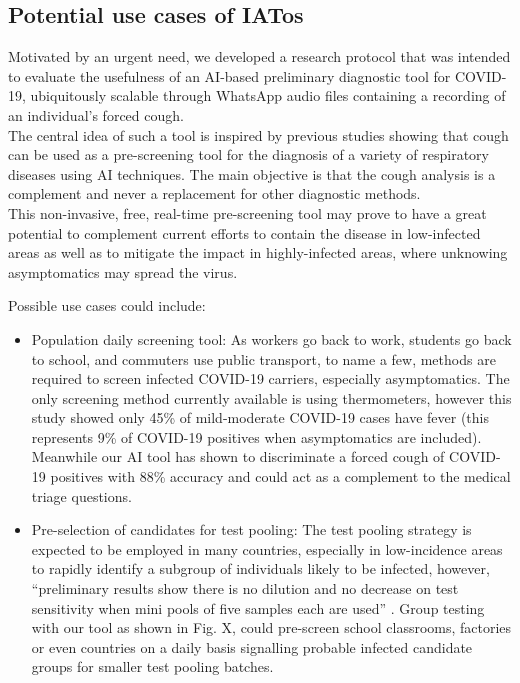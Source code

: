 \documentclass{nle}
\begin{document}
\subsection{Potential use cases of IATos}

Motivated by an urgent need, we developed a research protocol that was intended to evaluate the usefulness of an AI-based preliminary diagnostic tool for COVID-19, ubiquitously scalable through WhatsApp audio files containing a recording of an individual's forced cough.\\

The central idea of such a tool is inspired by previous studies \cite{10} \cite{16} showing that cough can be used as a pre-screening tool for the diagnosis of a variety of respiratory diseases using AI techniques. The main objective is that the cough analysis is a complement and never a replacement for other diagnostic methods.\\

This non-invasive, free, real-time pre-screening tool may prove to have a great potential to complement current efforts to contain the disease in low-infected areas as well as to mitigate the impact in highly-infected areas, where unknowing asymptomatics may spread the virus. 

Possible use cases could include:
\begin{itemize}
    \item Population daily screening tool: As workers go back to work, students go back to school, and commuters use public transport, to name a few, methods are required to screen infected COVID-19 carriers, especially asymptomatics. The only screening method currently available is using thermometers, however this study \cite{36} showed only 45\% of mild-moderate COVID-19 cases have fever (this represents 9\% of COVID-19 positives when asymptomatics are included). Meanwhile our AI tool  has shown to discriminate a forced cough of COVID-19 positives with 88\% accuracy and could act as a complement to the medical triage questions.
    \item Pre-selection of candidates for test pooling: The test pooling strategy is expected to be employed in many countries, especially in low-incidence areas to rapidly identify a subgroup of individuals likely to be infected, however, “preliminary results show there is no dilution and no decrease on test sensitivity when mini pools of five samples each are used” \cite{37}. Group testing with our tool as shown in Fig. X, could pre-screen school classrooms, factories or even countries on a daily basis signalling probable infected candidate groups for smaller test pooling batches.
\end{itemize}
\end{document}
